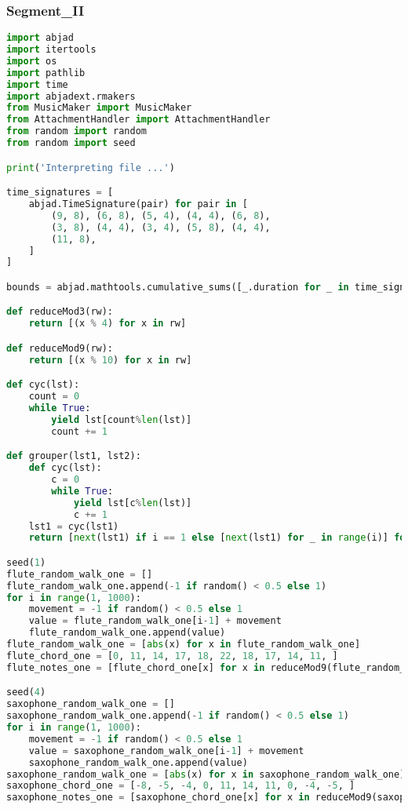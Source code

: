 \subsubsection{Segment\_II}
\singlespace
\begin{lstlisting}[language=Python, caption=Four Ages of Sand Segment\_II]
import abjad
import itertools
import os
import pathlib
import time
import abjadext.rmakers
from MusicMaker import MusicMaker
from AttachmentHandler import AttachmentHandler
from random import random
from random import seed

print('Interpreting file ...')

time_signatures = [
    abjad.TimeSignature(pair) for pair in [
        (9, 8), (6, 8), (5, 4), (4, 4), (6, 8),
        (3, 8), (4, 4), (3, 4), (5, 8), (4, 4),
        (11, 8),
    ]
]

bounds = abjad.mathtools.cumulative_sums([_.duration for _ in time_signatures])

def reduceMod3(rw):
    return [(x % 4) for x in rw]

def reduceMod9(rw):
    return [(x % 10) for x in rw]

def cyc(lst):
    count = 0
    while True:
        yield lst[count%len(lst)]
        count += 1

def grouper(lst1, lst2):
    def cyc(lst):
        c = 0
        while True:
            yield lst[c%len(lst)]
            c += 1
    lst1 = cyc(lst1)
    return [next(lst1) if i == 1 else [next(lst1) for _ in range(i)] for i in lst2]

seed(1)
flute_random_walk_one = []
flute_random_walk_one.append(-1 if random() < 0.5 else 1)
for i in range(1, 1000):
    movement = -1 if random() < 0.5 else 1
    value = flute_random_walk_one[i-1] + movement
    flute_random_walk_one.append(value)
flute_random_walk_one = [abs(x) for x in flute_random_walk_one]
flute_chord_one = [0, 11, 14, 17, 18, 22, 18, 17, 14, 11, ]
flute_notes_one = [flute_chord_one[x] for x in reduceMod9(flute_random_walk_one)]

seed(4)
saxophone_random_walk_one = []
saxophone_random_walk_one.append(-1 if random() < 0.5 else 1)
for i in range(1, 1000):
    movement = -1 if random() < 0.5 else 1
    value = saxophone_random_walk_one[i-1] + movement
    saxophone_random_walk_one.append(value)
saxophone_random_walk_one = [abs(x) for x in saxophone_random_walk_one]
saxophone_chord_one = [-8, -5, -4, 0, 11, 14, 11, 0, -4, -5, ]
saxophone_notes_one = [saxophone_chord_one[x] for x in reduceMod9(saxophone_random_walk_one)]


\end{lstlisting}
